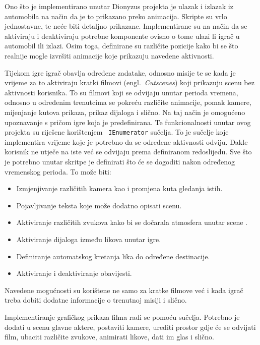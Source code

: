 Ono što je implementirano unutar Dionyzus projekta je ulazak i izlazak iz automobila
na način da je to prikazano preko animacija. Skripte su vrlo jednostavne, te neće
biti detaljno prikazane. Implementirane su na način da se aktiviraju i deaktiviraju
potrebne komponente ovisno o tome ulazi li igrač u automobil ili izlazi. Osim toga,
definirane su različite pozicije kako bi se što realnije mogle izvršiti animacije
koje prikazuju navedene aktivnosti.
 
Tijekom igre igrač obavlja određene zadatake, odnosno misije te se kada je vrijeme
za to aktiviraju kratki filmovi (engl.~\textit{Cutscenes}) koji prikazuju scenu bez
aktivnosti korisnika. To su filmovi koji se odvijaju unutar perioda vremena, odnosno
u određenim trenutcima se pokreću različite animacije, pomak kamere, mijenjanje
kutova prikaza, prikaz dijaloga i slično. Na taj način je omogućeno upoznavanje s
pričom igre koja je predefinirana. Te funkcionalnosti unutar ovog projekta su
riješene korištenjem ~\texttt{IEnumerator} sučelja. To je sučelje koje implementira vrijeme
koje je potrebno da se određene aktivnosti odviju. Dakle korisnik ne utječe na iste
već se odvijaju prema definiranom redoslijedu. Sve što je potrebno unutar skritpe je
definirati što će se dogoditi nakon određenog vremenskog perioda. To može biti:
 \begin{itemize}
  \item Izmjenjivanje različitih kamera kao i promjena kuta gledanja istih.
  \item Pojavljivanje teksta koje može dodatno opisati scenu.
  \item Aktiviranje različitih zvukova kako bi se dočarala atmosfera unutar scene .
  \item Aktiviranje dijaloga između likova unutar igre.
  \item Definiranje automatskog kretanja lika do određene destinacije.
  \item Aktiviranje i deaktiviranje obavijesti.
 \end{itemize}
Navedene mogućnosti su korištene ne samo za kratke filmove već i kada igrač treba
dobiti dodatne informacije o trenutnoj misiji i slično. 

Implementiranje grafičkog prikaza filma radi se pomoću sučelja. Potrebno je dodati u
scenu glavne aktere, postaviti kamere, urediti prostor gdje će se odvijati film,
ubaciti različite zvukove, animirati likove, dati im glas i slično.

